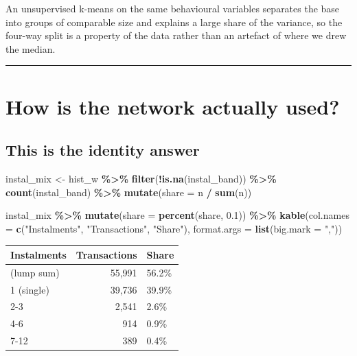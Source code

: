 \documentclass[
]{article}
\newenvironment{Shaded}{\begin{snugshade}}{\end{snugshade}}
\newcommand{\AttributeTok}[1]{\textcolor[rgb]{0.13,0.29,0.53}{#1}}
\newcommand{\FloatTok}[1]{\textcolor[rgb]{0.00,0.00,0.81}{#1}}
\newcommand{\FunctionTok}[1]{\textcolor[rgb]{0.13,0.29,0.53}{\textbf{#1}}}
\newcommand{\NormalTok}[1]{#1}
\newcommand{\OtherTok}[1]{\textcolor[rgb]{0.56,0.35,0.01}{#1}}
\newcommand{\SpecialCharTok}[1]{\textcolor[rgb]{0.81,0.36,0.00}{\textbf{#1}}}
\newcommand{\StringTok}[1]{\textcolor[rgb]{0.31,0.60,0.02}{#1}}
\newcounter{none} %
\begin{document}
An unsupervised k-means on the same behavioural variables separates the
base into groups of comparable size and explains a large share of the
variance, so the four-way split is a property of the data rather than an
artefact of where we drew the median.

\begin{center}\rule{0.5\linewidth}{0.5pt}\end{center}

\section{How is the network actually
used?}\label{how-is-the-network-actually-used}

\subsection{This is the identity
answer}\label{this-is-the-identity-answer}

\begin{Shaded}
\begin{Highlighting}[]
\NormalTok{instal\_mix }\OtherTok{\textless{}{-}}\NormalTok{ hist\_w }\SpecialCharTok{\%\textgreater{}\%} \FunctionTok{filter}\NormalTok{(}\SpecialCharTok{!}\FunctionTok{is.na}\NormalTok{(instal\_band)) }\SpecialCharTok{\%\textgreater{}\%}
  \FunctionTok{count}\NormalTok{(instal\_band) }\SpecialCharTok{\%\textgreater{}\%} \FunctionTok{mutate}\NormalTok{(}\AttributeTok{share =}\NormalTok{ n }\SpecialCharTok{/} \FunctionTok{sum}\NormalTok{(n))}

\NormalTok{instal\_mix }\SpecialCharTok{\%\textgreater{}\%} \FunctionTok{mutate}\NormalTok{(}\AttributeTok{share =} \FunctionTok{percent}\NormalTok{(share, }\FloatTok{0.1}\NormalTok{)) }\SpecialCharTok{\%\textgreater{}\%}
  \FunctionTok{kable}\NormalTok{(}\AttributeTok{col.names =} \FunctionTok{c}\NormalTok{(}\StringTok{"Instalments"}\NormalTok{, }\StringTok{"Transactions"}\NormalTok{, }\StringTok{"Share"}\NormalTok{),}
        \AttributeTok{format.args =} \FunctionTok{list}\NormalTok{(}\AttributeTok{big.mark =} \StringTok{","}\NormalTok{))}
\end{Highlighting}
\end{Shaded}

{\def\LTcaptype{none} %
\begin{longtable}[]{@{}lrl@{}}
\toprule\noalign{}
Instalments & Transactions & Share \\
\midrule\noalign{}
\endhead
\bottomrule\noalign{}
\endlastfoot
0 (lump sum) & 55,991 & 56.2\% \\
1 (single) & 39,736 & 39.9\% \\
2-3 & 2,541 & 2.6\% \\
4-6 & 914 & 0.9\% \\
7-12 & 389 & 0.4\% \\
\end{longtable}
}
\end{document}

